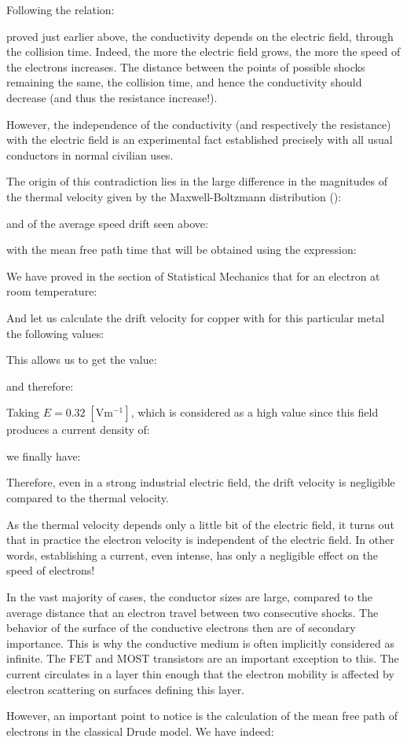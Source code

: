 	Following the relation:
	
	proved just earlier above, the conductivity depends on the electric field, through the collision time. Indeed, the more the electric field grows, the more the speed of the electrons increases. The distance between the points of possible shocks remaining the same, the collision time, and hence the conductivity should decrease (and thus the resistance increase!).
	
	However, the independence of the conductivity (and respectively the resistance) with the electric field is an experimental fact established precisely with all usual conductors in normal civilian uses.	
	
	The origin of this contradiction lies in the large difference in the magnitudes of the thermal velocity given by the Maxwell-Boltzmann distribution ():
	
	and of the average speed drift seen above:
	
	with the mean free path time that will be obtained using the expression:
	
	
	We have proved in the section of Statistical Mechanics that for an electron at room temperature:
	
	And let us calculate the drift velocity for copper with for this particular metal the following values:
	
	This allows us to get the value:
	
	and therefore:
	
	Taking $E=0.32 \;[\text{Vm}{}^{-1}]$, which is considered as a high value since this field produces a current density of:
	
	we finally have:
	
	Therefore, even in a strong industrial electric field, the drift velocity is negligible compared to the thermal velocity.
	
	As the thermal velocity depends only a little bit of the electric field, it turns out that in practice the electron velocity is independent of the electric field. In other words, establishing a current, even intense, has only a negligible effect on the speed of electrons!
	
	\begin{tcolorbox}[title=Remark,colframe=black,arc=10pt]
	In the vast majority of cases, the conductor sizes are large, compared to the average distance that an electron travel between two consecutive shocks. The behavior of the surface of the conductive electrons then are of secondary importance. This is why the conductive medium is often implicitly considered as infinite. The FET and MOST transistors  are an important exception to this. The current circulates in a layer thin enough that the electron mobility is affected by electron scattering on surfaces defining this layer.
	\end{tcolorbox}
	However, an important point to notice is the calculation of the mean free path of electrons in the classical Drude model. We have indeed:
	
